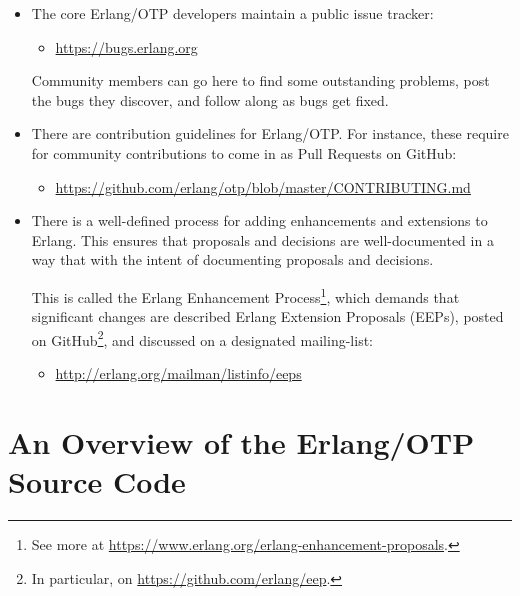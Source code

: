 \begin{itemize}
\item The core Erlang/OTP developers maintain a public issue tracker:

\begin{itemize}

\item \url{https://bugs.erlang.org}

\end{itemize}

Community members can go here to find some outstanding problems, post
the bugs they discover, and follow along as bugs get fixed.

\item There are contribution guidelines for Erlang/OTP. For instance,
these require for community contributions to come in as Pull Requests
on GitHub:

\begin{itemize}

\item \url{https://github.com/erlang/otp/blob/master/CONTRIBUTING.md}

\end{itemize}

\item There is a well-defined process for adding enhancements and
extensions to Erlang. This ensures that proposals and decisions are
well-documented in a way that with the intent of documenting proposals
and decisions.

This is called the Erlang Enhancement Process\footnote{See more at
\url{https://www.erlang.org/erlang-enhancement-proposals}.}, which
demands that significant changes are described Erlang Extension
Proposals (EEPs), posted on GitHub\footnote{In particular, on
\url{https://github.com/erlang/eep}.}, and discussed on a designated
mailing-list:

\begin{itemize}

\item \url{http://erlang.org/mailman/listinfo/eeps}

\end{itemize}

\end{itemize}

\section{An Overview of the Erlang/OTP Source Code}
\label{app:overview-of-erlang-source}

